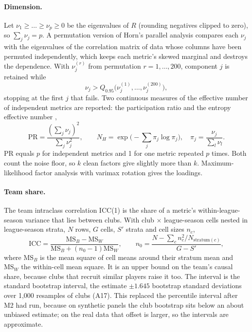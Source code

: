 \documentclass[11pt,a4paper]{article}
\begin{document}
\paragraph{Dimension.}
Let $\nu_1 \ge \dots \ge \nu_p \ge 0$ be the eigenvalues of $R$ (rounding
negatives clipped to zero), so $\sum_j \nu_j = p$. A permutation version of
Horn's parallel analysis \citep{horn1965parallel} compares each $\nu_j$ with the eigenvalues of the
correlation matrix of data whose columns have been permuted independently,
which keeps each metric's skewed marginal and destroys the dependence. With
$\nu^{(r)}_j$ from permutation $r = 1, \dots, 200$, component $j$ is retained
while
\begin{equation}
  \nu_j > Q_{0.95}\big(\nu^{(1)}_j, \dots, \nu^{(200)}_j\big),
  \label{eq:parallel}
\end{equation}
stopping at the first $j$ that fails. Two continuous measures of the effective
number of independent metrics are reported: the participation ratio
\citep[preprint;][]{gao2017dimensionality} and the entropy effective number
\citep{roy2007effective},
\begin{equation}
  \mathrm{PR} = \frac{\left(\sum_j \nu_j\right)^2}{\sum_j \nu_j^2},
  \qquad
  N_H = \exp\Big(-\sum_j \pi_j \log \pi_j\Big),\quad \pi_j = \frac{\nu_j}{\sum_l \nu_l}.
  \label{eq:pr}
\end{equation}
PR equals $p$ for independent metrics and 1 for one metric repeated $p$ times.
Both count the noise floor, so $k$ clean factors give slightly more than $k$.
Maximum-likelihood factor analysis \citep{joreskog1967ml} with varimax
rotation gives the loadings.

\paragraph{Team share.}
The team intraclass correlation ICC(1) \citep{shrout1979icc} is the share of a
metric's within-league-season variance that lies between clubs. With club
$\times$ league-season cells nested in league-season strata, $N$ rows, $G$
cells, $S'$ strata and cell sizes $n_c$,
\begin{equation}
  \mathrm{ICC} = \frac{\mathrm{MS}_B - \mathrm{MS}_W}{\mathrm{MS}_B + (n_0 - 1)\mathrm{MS}_W},
  \qquad
  n_0 = \frac{N - \sum_c n_c^2 / N_{\text{stratum}(c)}}{G - S'},
  \label{eq:icc}
\end{equation}
where $\mathrm{MS}_B$ is the mean square of cell means around their stratum
mean and $\mathrm{MS}_W$ the within-cell mean square. It is an upper bound on
the team's causal share, because clubs that recruit similar players raise it
too. The interval is the standard bootstrap interval, the estimate $\pm 1.645$
bootstrap standard deviations over 1,000 resamples of clubs (A17). This
replaced the percentile interval after M2 had run, because on synthetic panels
the club bootstrap sits below an about unbiased estimate; on the real data that
offset is larger, so the intervals are approximate.
\end{document}
